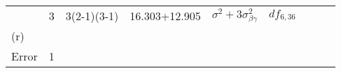 \documentclass[12pt,]{article}
\begin{document}
\begin{longtable}[]{@{}lllllllll@{}}
\begin{minipage}[t]{0.03\columnwidth}
\strut
\end{minipage} & \begin{minipage}[t]{0.03\columnwidth}\raggedright
3\strut
\end{minipage} & \begin{minipage}[t]{0.12\columnwidth}\raggedright
3(2-1)(3-1)\strut
\end{minipage} & \begin{minipage}[t]{0.15\columnwidth}\raggedright
16.303+12.905\strut
\end{minipage} & \begin{minipage}[t]{0.21\columnwidth}\raggedright
\(\sigma^2+3\sigma^2_{\beta\gamma}\)\strut
\end{minipage} & \begin{minipage}[t]{0.09\columnwidth}\raggedright
\(df_{6,36}\)\strut
\end{minipage}\tabularnewline
\begin{minipage}[t]{0.06\columnwidth}\raggedright
(r)\strut
\end{minipage} & \begin{minipage}[t]{0.03\columnwidth}\raggedright
\strut
\end{minipage} & \begin{minipage}[t]{0.03\columnwidth}\raggedright
\strut
\end{minipage} & \begin{minipage}[t]{0.03\columnwidth}\raggedright
\strut
\end{minipage} & \begin{minipage}[t]{0.03\columnwidth}\raggedright
\strut
\end{minipage} & \begin{minipage}[t]{0.12\columnwidth}\raggedright
\strut
\end{minipage} & \begin{minipage}[t]{0.15\columnwidth}\raggedright
\strut
\end{minipage} & \begin{minipage}[t]{0.21\columnwidth}\raggedright
\strut
\end{minipage} & \begin{minipage}[t]{0.09\columnwidth}\raggedright
\strut
\end{minipage}\tabularnewline
\begin{minipage}[t]{0.06\columnwidth}\raggedright
Error\strut
\end{minipage} & \begin{minipage}[t]{0.03\columnwidth}\raggedright
1\strut
\end{minipage} & \begin{minipage}[t]{0.03\columnwidth}\raggedright

\end{minipage}
\end{longtable}
\end{document}
